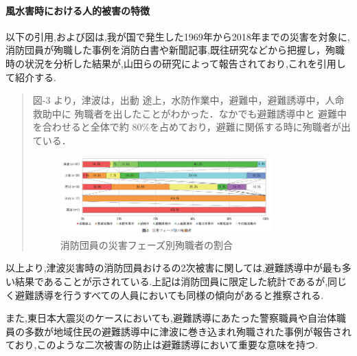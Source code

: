 \paragraph{風水害時における人的被害の特徴}
以下の引用,および図\cite{fig:fig-01}は,我が国で発生した1969年から2018年までの災害を対象に,消防団員が殉職した事例を消防白書や新聞記事,既往研究などから把握し，殉職時の状況を分析した結果が,山田らの研究\cite{yamada2020}によって報告されており,これを引用して紹介する.
\begin{quote}
  図-3 より，津波は，出動 途上，水防作業中，避難中，避難誘導中，人命救助中に 殉職者を出したことがわかった．なかでも避難誘導中と 避難中を合わせると全体で約 80\%を占めており，避難に関係する時に殉職者が出ている．
  \begin{figure}[H] 
    \centering 
    \includegraphics[width=0.8\textwidth]{Figures/fig-01.png}
    \caption{消防団員の災害フェーズ別殉職者の割合} 
    \label{fig:fig-01}
  \end{figure}
\end{quote}
以上より,津波災害時の消防団員おけるの2次被害に関しては,避難誘導中が最も多い結果であることが示されている.上記は消防団員に限定した統計であるが,同じく避難誘導を行うすべての人員においても同様の傾向があると推察される.\par
また,東日本大震災のケースにおいても,避難誘導にあたった警察職員や自治体職員の多数が地域住民の避難誘導中に津波に巻き込まれ殉職された事例が報告されており\cite{npa2012}\cite{syouboukikin2012},このような二次被害の防止は避難誘導において重要な意味を持つ.

